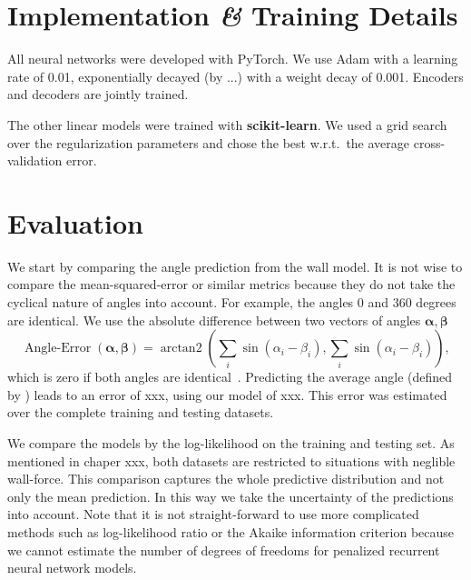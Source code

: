 \documentclass[nobib]{tufte-handout}
\begin{document}
\section{Implementation \textit{\&} Training Details}
All neural networks were developed with PyTorch.
We use Adam with a learning rate of 0.01, exponentially decayed (by ...) with a weight decay of 0.001.
Encoders and decoders are jointly trained.

The other linear models were trained with \textbf{scikit-learn}\autocite{scikitLearn}.
We used a grid search over the regularization parameters and chose the best w.r.t.\ the average cross-validation error.

\section{Evaluation}
We start by comparing the angle prediction from the wall model.
It is not wise to compare the mean-squared-error or similar metrics because they do not take the cyclical nature of angles into account.
For example, the angles 0 and 360 degrees are identical.
We use the absolute difference between two vectors of angles \(\bm{\alpha}, \bm{\beta}\)
\begin{equation*}
 \operatorname{Angle-Error}(\bm{\alpha}, \bm{\beta}) = \operatorname{arctan2} \left( \sum_i \sin \left( \alpha_i - \beta_i  \right),  \sum_i \sin \left( \alpha_i - \beta_i \right)  \right),
\end{equation*}
which is zero if both angles are identical~\autocite{circularStatistics}.
Predicting the average angle (defined by ) leads to an error of xxx, using our model of xxx.
This error was estimated over the complete training and testing datasets.

We compare the models by the log-likelihood on the training and testing set.
As mentioned in chaper xxx, both datasets are restricted to situations with neglible wall-force.
This comparison captures the whole predictive distribution and not only the mean prediction.
In this way we take the uncertainty of the predictions into account.
Note that it is not straight-forward to use more complicated methods such as log-likelihood ratio or the Akaike information criterion because we cannot estimate the number of degrees of freedoms for penalized recurrent neural network models.
\end{document}

